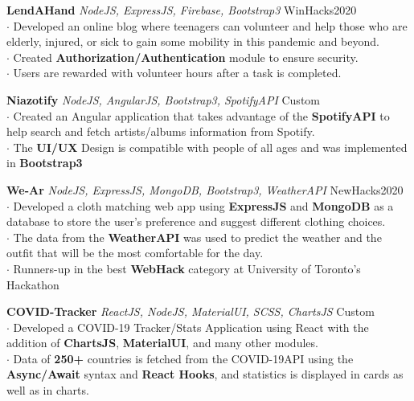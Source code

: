 \documentclass[a4paper]{article}
\begin{document}
{\textbf{LendAHand}} {\sl NodeJS, ExpressJS, Firebase, Bootstrap3} \hfill WinHacks2020\\
$\cdot$ Developed an online blog where teenagers can volunteer and help those who are elderly, injured, or sick to gain some mobility in this pandemic and beyond.\\
$\cdot$ Created {\textbf{Authorization/Authentication}} module to ensure security.\\
$\cdot$ Users are rewarded with volunteer hours after a task is completed.\\
\vspace*{2mm}

{\textbf{Niazotify}} {\sl NodeJS, AngularJS, Bootstrap3, SpotifyAPI} \hfill Custom\\
$\cdot$ Created an Angular application that takes advantage of the {\textbf{SpotifyAPI}} to help search and fetch artists/albums information from Spotify.\\  $\cdot$ The {\textbf{UI/UX}} Design is compatible with people of all ages and was implemented in {\textbf{Bootstrap3}} \\
\vspace*{2mm}

{\textbf{We-Ar}} {\sl NodeJS, ExpressJS, MongoDB, Bootstrap3, WeatherAPI} \hfill NewHacks2020\\
$\cdot$ Developed a cloth matching web app using {\textbf{ExpressJS}} and {\textbf{MongoDB}} as a database to store the user's preference and suggest different clothing choices.\\
$\cdot$ The data from the {\textbf{WeatherAPI}} was used to predict the weather and the outfit that will be the most comfortable for the day.\\
$\cdot$ Runners-up in the best {\textbf{WebHack}} category at University of Toronto's Hackathon\\
\vspace*{2mm}

{\textbf{COVID-Tracker}} {\sl ReactJS, NodeJS, MaterialUI, SCSS, ChartsJS} \hfill Custom\\
$\cdot$ Developed a COVID-19 Tracker/Stats Application using React with the addition of {\textbf{ChartsJS}}, {\textbf{MaterialUI}}, and many other modules.\\ $\cdot$ Data of {\textbf{250+}} countries is fetched from the COVID-19API using the {\textbf{Async/Await}} syntax and {\textbf{React Hooks}}, and statistics is displayed in cards as well as in charts.\\
\vspace*{2mm}
\end{document}
